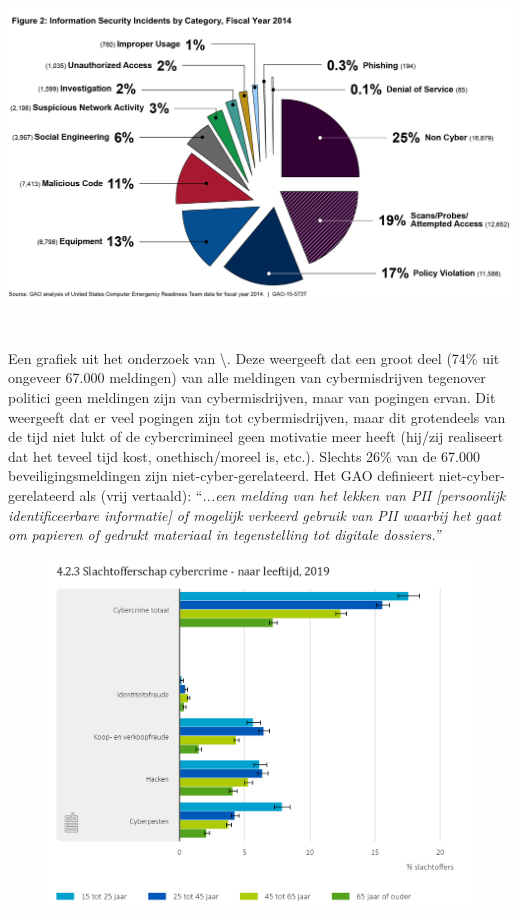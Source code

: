 \documentclass[
]{article}
\begin{document}
\includegraphics[width=5.511811024in,height=3.65918in]{media/image1.png}

Een grafiek uit het onderzoek van
\textbackslash \cite{Wilshusen2015-rm}. Deze weergeeft dat een groot
deel (74\% uit ongeveer 67.000 meldingen) van alle meldingen van
cybermisdrijven tegenover politici geen meldingen zijn van
cybermisdrijven, maar van pogingen ervan. Dit weergeeft dat er veel
pogingen zijn tot cybermisdrijven, maar dit grotendeels van de tijd niet
lukt of de cybercrimineel geen motivatie meer heeft (hij/zij realiseert
dat het teveel tijd kost, onethisch/moreel is, etc.). Slechts 26\% van
de 67.000 beveiligingsmeldingen zijn niet-cyber-gerelateerd. Het GAO
definieert niet-cyber-gerelateerd als (vrij vertaald): ``\emph{...een
melding van het lekken van PII {[}persoonlijk identificeerbare
informatie{]} of mogelijk verkeerd gebruik van PII waarbij het gaat om
papieren of gedrukt materiaal in tegenstelling tot digitale dossiers.''}

\includegraphics[width=5.511811024in,height=3.67133in]{media/image2.png}
\end{document}
